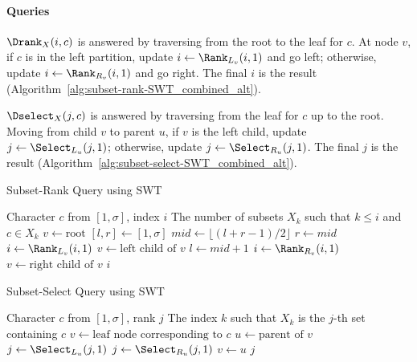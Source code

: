 \paragraph{Queries}
$\Drank_X(i, c)$ is answered by traversing from the root to the leaf for $c$. At node $v$, if $c$ is in the left partition, update $i \leftarrow \Rank_{L_v}(i, 1)$ and go left; otherwise, update $i \leftarrow \Rank_{R_v}(i, 1)$ and go right. The final $i$ is the result (Algorithm~\ref{alg:subset-rank-SWT_combined_alt}).

$\Dselect_X(j, c)$ is answered by traversing from the leaf for $c$ up to the root. Moving from child $v$ to parent $u$, if $v$ is the left child, update $j \leftarrow \Select_{L_u}(j, 1)$; otherwise, update $j \leftarrow \Select_{R_u}(j, 1)$. The final $j$ is the result (Algorithm~\ref{alg:subset-select-SWT_combined_alt}).


\begin{algorithm}[hbtp]
    \caption{Subset-Rank Query using SWT {\cite[cf.][]{SubsetWT}}}
    \label{alg:subset-rank-SWT_combined_alt}
    \begin{algorithmic}[1] %
        \Require Character $c$ from $[1, \sigma]$, index $i$
        \Ensure The number of subsets $X_k$ such that $k \leq i$ and $c \in X_k$
        \State $v \gets \text{root}$
        \State $[l, r] \gets [1, \sigma]$ 
        \State $mid \gets \lfloor (l+r-1)/2 \rfloor$
        \State $r \gets mid$
        \State $i \gets \Rank_{L_v}(i, 1)$ 
        \State $v \gets \text{left child of } v$
        \Else
        \State $l \gets mid + 1$
        \State $i \gets \Rank_{R_v}(i, 1)$ 
        \State $v \gets \text{right child of } v$
        \EndIf
        \EndWhile
        \State \Return $i$
        \EndFunction
    \end{algorithmic}
\end{algorithm}

\begin{algorithm}[hbtp]
    \caption{Subset-Select Query using SWT {\cite[cf.][]{SubsetWT}}}
    \label{alg:subset-select-SWT_combined_alt}
    \begin{algorithmic}[1] %
        \Require Character $c$ from $[1, \sigma]$, rank $j$
        \Ensure The index $k$ such that $X_k$ is the $j$-th set containing $c$
        \State $v \gets \text{leaf node corresponding to } c$
        \State $u \gets \text{parent of } v$
        \State $j \gets \Select_{L_u}(j, 1)$ 
        \Else
        \State $j \gets \Select_{R_u}(j, 1)$ 
        \EndIf
        \State $v \gets u$
        \EndWhile
        \State \Return $j$
        \EndFunction
    \end{algorithmic}
\end{algorithm}

